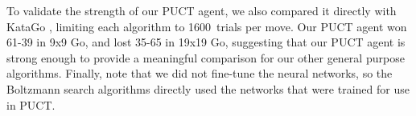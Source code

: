             To validate the strength of our PUCT agent, we also compared it directly with KataGo %
            , limiting each algorithm to 1600~trials per move. Our PUCT agent won 61-39 in 9x9 Go, and lost 35-65 in 19x19 Go, suggesting that our PUCT agent is strong enough to provide a meaningful comparison for our other general purpose algorithms. Finally, note that we did not fine-tune the neural networks, so the Boltzmann search algorithms directly used the networks that were trained for use in PUCT.
            
          	

